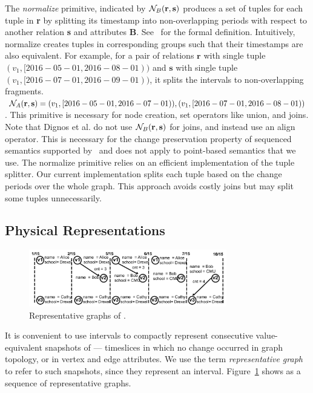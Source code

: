 The {\em normalize} primitive, indicated by $\mathcal{N}_{B}(\mathbf{r},\mathbf{s})$ produces
a set of tuples for each tuple in {\bf r} by splitting its timestamp
into non-overlapping periods with respect to another relation {\bf s}
and attributes {\bf B}.  See~\cite{Dignos2012} for the formal
definition.  Intuitively, normalize creates tuples in corresponding
groups such that their timestamps are also equivalent.  For example,
for a pair of relations $\mathbf{r}$ with single tuple $(v_1,
[2016-05-01, 2016-08-01))$ and $\mathbf{s}$ with single tuple $(v_1,
  [2016-07-01, 2016-09-01))$, it splits the intervals to
    non-overlapping fragments. $\mathcal{N}_{A}(\mathbf{r},\mathbf{s}) = (v_1, [2016-05-01,
      2016-07-01)),(v_1, [2016-07-01, 2016-08-01))$.  This primitive
        is necessary for node creation, set operators like union, and
        joins.  Note that Dignos et al. do not use $\mathcal{N}_{B}(\mathbf{r},\mathbf{s})$
        for joins, and instead use an align operator.  This is
        necessary for the change preservation property of sequenced
        semantics supported by~\cite{Dignos2012} and does not apply to
        point-based semantics that we use.  The normalize primitive
        relies on an efficient implementation of the tuple splitter.
        Our current implementation splits each tuple based on the
        change periods over the whole graph.  This approach avoids
        costly joins but may split some tuples unnecessarily.

\subsection{Physical Representations}
\label{sec:sys:datastructs}

\begin{figure}[t!]
\centering
\includegraphics[width=3.4in]{figs/T1_graphs.pdf}
\caption{Representative graphs of \tg {}.}
\label{fig:tg_rg}
\end{figure}

It is convenient to use intervals to compactly represent consecutive
value-equivalent snapshots of \tve --- timeslices in which no change
occurred in graph topology, or in vertex and edge attributes.  We use
the term {\em representative graph} to refer to such snapshots, since
they represent an interval.  Figure~\ref{fig:tg_rg} shows 
as a sequence of representative graphs.


